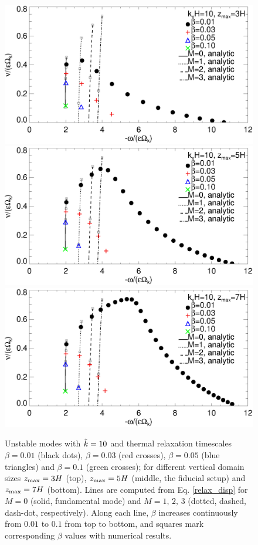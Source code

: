 \begin{figure}
  \includegraphics[width=\linewidth,clip=true,trim=0cm 1.75cm 0cm
  0cm]{figures/compare_modes_cool_kx10_z3_analytic.ps} 
  \includegraphics[width=\linewidth,clip=true,trim=0cm 1.75cm 0cm
  0cm]{figures/compare_modes_cool_kx10_z5_analytic.ps}
  \includegraphics[width=\linewidth]{figures/compare_modes_cool_kx10_z7_analytic.ps}
  \caption{Unstable modes with $\hat{k}=10$ and thermal
    relaxation timescales $\beta=0.01$ (black dots), $\beta=0.03$ (red
    crosses), $\beta=0.05$ (blue triangles) and $\beta=0.1$ (green 
    crosses); for different vertical domain sizes $z_\mathrm{max}=3H$ (top),
    $z_\mathrm{max}=5H$ (middle, the fiducial setup) and $z_\mathrm{max}=7H$
    (bottom). Lines are computed from
    Eq. \ref{relax_disp} for  $M=0$ (solid, fundamental mode) and
    $M=1,\,2,\,3$ (dotted, dashed, dash-dot, respectively). Along each
    line, $\beta$ increases continuously from $0.01$ to $0.1$ from top
    to bottom, and squares mark corresponding $\beta$ values with
    numerical results. 
    \label{compare_modes_cool_kx10} 
  }
\end{figure}

